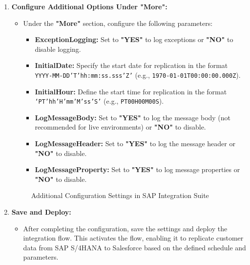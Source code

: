 \begin{enumerate}
    \item \textbf{Configure Additional Options Under "More":}
    \begin{itemize}
        \item Under the \textbf{"More"} section, configure the following parameters:
        \begin{itemize}
            \item \textbf{ExceptionLogging:} Set to \textbf{"YES"} to log exceptions or \textbf{"NO"} to disable logging.
            \item \textbf{InitialDate:} Specify the start date for replication in the format \texttt{YYYY-MM-DD’T’hh:mm:ss.sss’Z’} (e.g., \texttt{1970-01-01T00:00:00.000Z}).
            \item \textbf{InitialHour:} Define the start time for replication in the format \texttt{‘PT’hh’H’mm’M’ss’S’} (e.g., \texttt{PT00H00M00S}).
            \item \textbf{LogMessageBody:} Set to \textbf{"YES"} to log the message body (not recommended for live environments) or \textbf{"NO"} to disable.
            \item \textbf{LogMessageHeader:} Set to \textbf{"YES"} to log the message header or \textbf{"NO"} to disable.
            \item \textbf{LogMessageProperty:} Set to \textbf{"YES"} to log message properties or \textbf{"NO"} to disable.
        \end{itemize}
    \end{itemize}

    \begin{figure}[H]
    \centering
    \caption{Additional Configuration Settings in SAP Integration Suite}
    
    \end{figure}

    \item \textbf{Save and Deploy:}
    \begin{itemize}
        \item After completing the configuration, save the settings and deploy the integration flow. This activates the flow, enabling it to replicate customer data from SAP S/4HANA to Salesforce based on the defined schedule and parameters.
    \end{itemize}
\end{enumerate}


